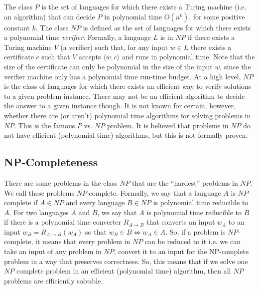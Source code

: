 \documentclass[10pt,a4paper]{article}
\begin{document}
The class $P$ is the set of languages for which there exists a Turing machine (i.e. an algorithm) that can decide $P$ in polynomial time $O(n^k)$, for some positive constant $k$. The class $NP$ is defined as the set of languages for which there exists a polynomial time \textit{verifier}. Formally, a language $L$ is in $NP$ if there exists a Turing machine $V$ (a verifier) such that, for any input $w \in L$ 
there exists a certificate $c$ such that $V$ accepts $\langle w,c \rangle$ and runs in polynomial time. Note that the size of the certificate can only be polynomial in the size of the input $w$, since the verifier machine only has a polynomial time run-time budget. At a high level, $NP$ is the class of languages for which there exists an efficient way to verify solutions to a given problem instance. There may not be an efficient algorithm to decide the answer to a given instance though. It is not known for certain, however, whether there are (or aren't) polynomial time algorithms for solving problems in $NP$. This is the famous $P$ vs. $NP$ problem. It is believed that problems in $NP$ do not have efficient (polynomial time) algorithms, but this is not formally proven. 

\subsection{NP-Completeness}

There are some problems in the class $NP$ that are the ``hardest'' problems in $NP$. We call these problems $NP$-complete. Formally, we say that a language $A$ is $NP$-complete if $A \in NP$ and every language $B \in NP$ is polynomial time reducible to $A$. For two languages $A$ and $B$, we say that $A$ is polynomial time reducible to $B$ if there is a polynomial time converter $R_{A\rightarrow B}$ that converts an input $w_A$ to an input $w_B = R_{A\rightarrow B}(w_A)$ so that $w_B \in B \iff w_A \in A$. So, if a problem is $NP$-complete, it means that every problem in $NP$ can be reduced to it i.e. we can take an input of any problem in $NP$, convert it to an input for the NP-complete problem in a way that preserves correctness. So, this means that if we solve one $NP$ complete problem in an efficient (polynomial time) algorithm, then all $NP$ problems are efficiently solvable. 
\end{document}
